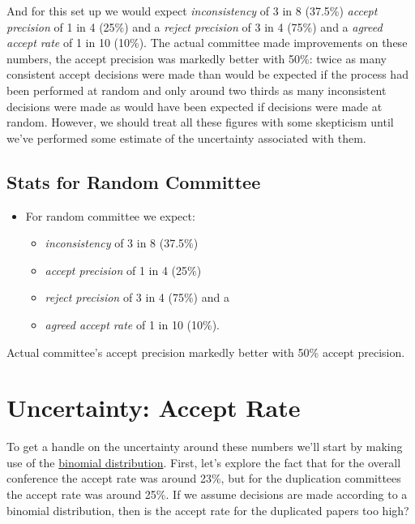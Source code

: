 And for this set up we would expect \emph{inconsistency} of 3 in 8
(37.5\%) \emph{accept precision} of 1 in 4 (25\%) and a \emph{reject
precision} of 3 in 4 (75\%) and a \emph{agreed accept rate} of 1 in 10
(10\%). The actual committee made improvements on these numbers, the
accept precision was markedly better with 50\%: twice as many consistent
accept decisions were made than would be expected if the process had
been performed at random and only around two thirds as many inconsistent
decisions were made as would have been expected if decisions were made
at random. However, we should treat all these figures with some
skepticism until we've performed some estimate of the uncertainty
associated with them.

\hypertarget{stats-for-random-committee}{%
\subsection{Stats for Random
Committee}\label{stats-for-random-committee}}

\begin{itemize}
\tightlist
\item
  For random committee we expect:

  \begin{itemize}
  \tightlist
  \item
    \emph{inconsistency} of 3 in 8 (37.5\%)
  \item
    \emph{accept precision} of 1 in 4 (25\%)
  \item
    \emph{reject precision} of 3 in 4 (75\%) and a
  \item
    \emph{agreed accept rate} of 1 in 10 (10\%).
  \end{itemize}
\end{itemize}

Actual committee's accept precision markedly better with 50\% accept
precision.

\hypertarget{uncertainty-accept-rate}{%
\section{Uncertainty: Accept Rate}\label{uncertainty-accept-rate}}

To get a handle on the uncertainty around these numbers we'll start by
making use of the
\href{http://en.wikipedia.org/wiki/Binomial_distribution}{binomial distribution}.
First, let's explore the fact that for the overall conference the accept
rate was around 23\%, but for the duplication committees the accept rate
was around 25\%. If we assume decisions are made according to a binomial
distribution, then is the accept rate for the duplicated papers too
high?

